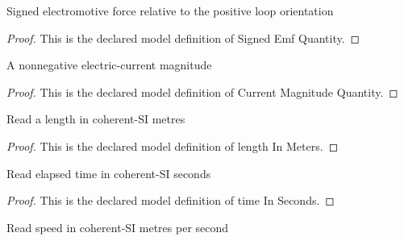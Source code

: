 \begin{definition}
  \label{def:physics:phyx-mini-0918:phyxminiproblems-problemphyxmini0918-signedemfquantity}
  Signed electromotive force relative to the positive loop orientation
\end{definition}
\begin{proof}
  This is the declared model definition of Signed Emf Quantity.
\end{proof}
\begin{definition}
  \label{def:physics:phyx-mini-0918:phyxminiproblems-problemphyxmini0918-currentmagnitudequantity}
  A nonnegative electric-current magnitude
\end{definition}
\begin{proof}
  This is the declared model definition of Current Magnitude Quantity.
\end{proof}
\begin{definition}
  \label{def:physics:phyx-mini-0918:phyxminiproblems-problemphyxmini0918-lengthinmeters}
  Read a length in coherent-SI metres
\end{definition}
\begin{proof}
  This is the declared model definition of length In Meters.
\end{proof}
\begin{definition}
  \label{def:physics:phyx-mini-0918:phyxminiproblems-problemphyxmini0918-timeinseconds}
  Read elapsed time in coherent-SI seconds
\end{definition}
\begin{proof}
  This is the declared model definition of time In Seconds.
\end{proof}
\begin{definition}
  \label{def:physics:phyx-mini-0918:phyxminiproblems-problemphyxmini0918-speedinmeterspersecond}
  Read speed in coherent-SI metres per second
\end{definition}
